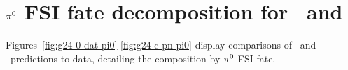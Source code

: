  

\section*{$\pi^0$ FSI fate decomposition for \gZero\ and \gC}\label{sec:appfate}

Figures~\ref{fig:g24-0-dat-pi0}-\ref{fig:g24-c-pn-pi0} display comparisons of \gZero\ and \gC\ predictions to data, detailing the composition by $\pi^0$ FSI fate.


